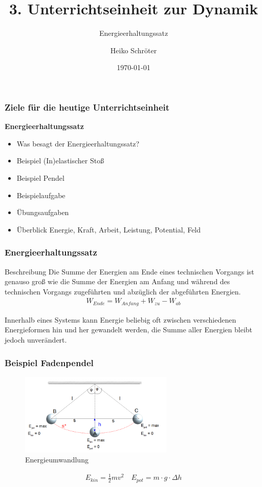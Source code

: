 \documentclass{article}
\title{3. Unterrichtseinheit zur Dynamik}
\subtitle{Energieerhaltungssatz}
\author{Heiko Schröter}
\date{\today}
\begin{document}
\frame{\titlepage}

\frame
{
  \frametitle{Ziele für die heutige Unterrichtseinheit}
  \textbf{Energieerhaltungssatz}
  \begin{itemize}
	\item Was besagt der Energieerhaltungssatz?
	\item Beispiel (In)elastischer Stoß
	\item Beispiel Pendel
	\item Beispielaufgabe
	\item Übungsaufgaben
	\item Überblick Energie, Kraft, Arbeit, Leistung, Potential, Feld
  \end{itemize}
}

\frame
{
  \frametitle{Energieerhaltungssatz}
\begin{block}{Beschreibung}
Die Summe der Energien am Ende eines technischen Vorgangs ist genauso groß wie die Summe der Energien am Anfang und während des technischen Vorgangs zugeführten und abzüglich der abgeführten Energien.
\begin{align*}
W_{Ende}=W_{Anfang}+W_{zu}-W_{ab}
\end{align*}
\end{block}
Innerhalb eines Systems kann Energie beliebig oft zwischen verschiedenen Energieformen hin und her gewandelt werden, die Summe aller Energien bleibt jedoch unverändert.
}

\frame
{
  \frametitle{Beispiel Fadenpendel}
      \begin{figure}
	  \includegraphics[width=0.65\textwidth]{Fadenpendel}
	  \vspace{-3mm}
	  \caption{Energieumwandlung}
   \end{figure}
  \begin{block}{}
	\begin{align*}
	E_{kin}=\frac{1}{2}mv^2\quad
	E_{pot}=m\cdot g\cdot \Delta h
	\end{align*}
  \end{block}
}
\end{document}
